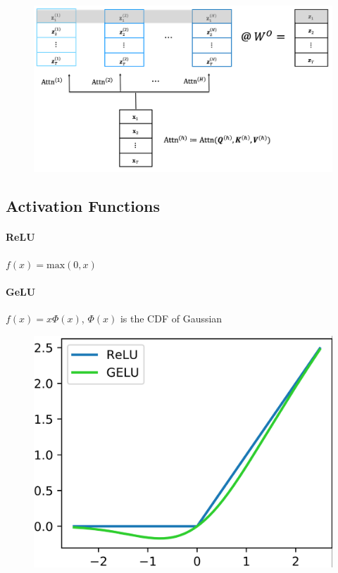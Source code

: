 \documentclass{article}
\begin{document}
\begin{figure}[h]
\centering
\includegraphics[scale=0.4]{imgs/multi-head.png}
\end{figure}

\clearpage

\subsection{Activation Functions}

\paragraph{ReLU} $f(x) = \text{max}(0, x)$

\paragraph{GeLU} $f(x) = x \Phi(x)$, $\Phi(x)$ is the CDF of Gaussian

\begin{figure}[h]
\centering
\includegraphics[scale=0.15]{imgs/relu-gelu.png}
\end{figure}
\end{document}
